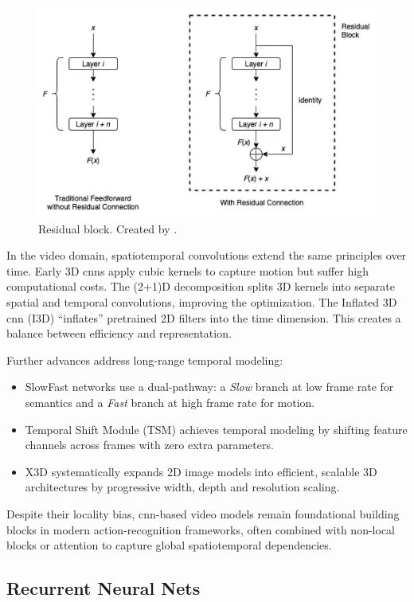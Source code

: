 \begin{figure}
    \centering
    \includegraphics[width=0.5\linewidth]{figures/res_connection.png} 
    \caption{Residual block. Created by \textcite{wong_what_is_residual_2022}.}
    \label{fig:res_connection}
\end{figure}

In the video domain, spatiotemporal convolutions extend the same principles over time. Early 3D \acrshort{cnn}s \cite{tran_learning_2015} apply cubic kernels to capture motion but suffer high computational costs. The (2+1)D decomposition \cite{tran_2_plus_1_convolution} splits 3D kernels into separate spatial and temporal convolutions, improving the optimization. The Inflated 3D \acrshort{cnn} (I3D) \cite{carreira_2017_i3d_quo_vadis} “inflates” pretrained 2D filters into the time dimension. This creates a balance between efficiency and representation.

Further advances address long-range temporal modeling:
\begin{itemize}
    \item SlowFast networks \cite{feichtenhofer_slowfast_2019} use a dual-pathway: a \emph{Slow} branch at low frame rate for semantics and a \emph{Fast} branch at high frame rate for motion.  
    \item Temporal Shift Module (TSM) \cite{lin_temporal_shift_2019} achieves temporal modeling by shifting feature channels across frames with zero extra parameters.  
    \item X3D \cite{feichtenhofer_x3d_2020} systematically expands 2D image models into efficient, scalable 3D architectures by progressive width, depth and resolution scaling.
\end{itemize}

Despite their locality bias, \acrshort{cnn}-based video models remain foundational building blocks in modern action-recognition frameworks, often combined with non-local blocks or attention to capture global spatiotemporal dependencies.


\subsection{Recurrent Neural Nets}

